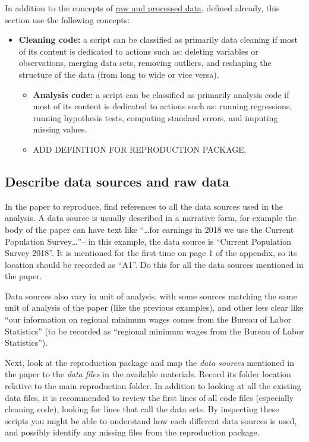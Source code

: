 \documentclass[]{book}
\begin{document}
In addition to the concepts of \protect\hyperlink{intensive}{raw and processed data}, defined already, this section use the following concepts:

\begin{itemize}
\item
  \textbf{Cleaning code:} a script can be classified as primarily data cleaning if most of its content is dedicated to actions such as: deleting variables or observations, merging data sets, removing outliers, and reshaping the structure of the data (from long to wide or vice versa).

  \begin{itemize}
  \item
    \textbf{Analysis code:} a script can be classified as primarily analysis code if most of its content is dedicated to actions such as: running regressions, running hypothesis tests, computing standard errors, and imputing missing values.
  \item
    ADD DEFINITION FOR REPRODUCTION PACKAGE.
  \end{itemize}
\end{itemize}

\hypertarget{describe-data-sources-and-raw-data}{%
\subsection{Describe data sources and raw data}\label{describe-data-sources-and-raw-data}}

In the paper to reproduce, find references to all the data sources used in the analysis. A data source is usually described in a narrative form, for example the body of the paper can have text like ``\ldots{}for earnings in 2018 we use the Current Population Survey\ldots{}''-- in this example, the data source is ``Current Population Survey 2018''. It is mentioned for the first time on page 1 of the appendix, so its location should be recorded as ``A1''. Do this for all the data sources mentioned in the paper.

Data sources also vary in unit of analysis, with some sources matching the same unit of analysis of the paper (like the previous examples), and other less clear like ``our information on regional minimum wages comes from the Bureau of Labor Statistics'' (to be recorded as ``regional minimum wages from the Bureau of Labor Statistics'').

Next, look at the reproduction package and map the \emph{data sources} mentioned in the paper to the \emph{data files} in the available materials. Record its folder location relative to the main reproduction folder. In addition to looking at all the existing data files, it is recommended to review the first lines of all code files (especially cleaning code), looking for lines that call the data sets. By inspecting these scripts you might be able to understand how each different data sources is used, and possibly identify any missing files from the reproduction package.
\end{document}
